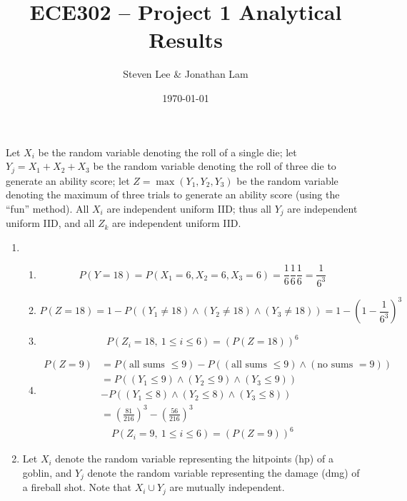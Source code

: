 \documentclass{article}
\title{ECE302 -- Project 1 Analytical Results}
\author{Steven Lee \& Jonathan Lam}
\date{\today}
\begin{document}
	\maketitle
	
	\noindent Let $X_i$ be the random variable denoting the roll of a single die; let $Y_j=X_1+X_2+X_3$ be the random variable denoting the roll of three die to generate an ability score; let $Z=\max(Y_1,Y_2,Y_3)$ be the random variable denoting the maximum of three trials to generate an ability score (using the ``fun'' method). All $X_i$ are independent uniform IID; thus all $Y_j$ are independent uniform IID, and all $Z_k$ are independent uniform IID.
	
	\begin{enumerate}
		\item 
		\begin{enumerate}
			\item \begin{equation*}
				P(Y=18)=P(X_1=6,X_2=6,X_3=6)=\frac{1}{6}\frac{1}{6}\frac{1}{6}=\frac{1}{6^3}
			\end{equation*}
			
			\item
			\begin{equation*}
				P(Z=18)=1-P((Y_1\ne 18)\land (Y_2\ne 18)\land (Y_3\ne 18))=1-\left(1-\frac{1}{6^3}\right)^3
			\end{equation*}
			
			\item
			\begin{equation*}
				P(Z_i=18,\ 1\le i\le 6)=(P(Z=18))^6
			\end{equation*}
			
			\item 
			\begin{align*}
				P(Z=9)&=P(\text{all sums }\le 9)-P((\text{all sums }\le9)\land(\text{no sums }=9))\\
				&=P((Y_1\le 9)\land (Y_2\le 9)\land(Y_3\le 9))\\
				&-P((Y_1\le 8)\land (Y_2\le 8)\land(Y_3\le 8))\\
				&=\left(\frac{81}{216}\right)^3-\left(\frac{56}{216}\right)^3
			\end{align*}
			\begin{gather*}
				P(Z_i=9,\ 1\le i\le 6)=(P(Z=9))^6
			\end{gather*}
		\end{enumerate}
	
		\clearpage
		\item
		Let $X_i$ denote the random variable representing the hitpoints (hp) of a goblin, and $Y_j$ denote the random variable representing the damage (dmg) of a fireball shot. Note that $X_i\cup Y_j$ are mutually independent.
		

\end{enumerate}
\end{document}
